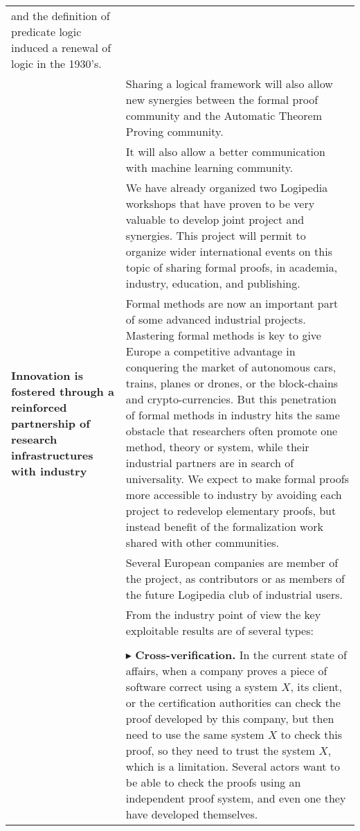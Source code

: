 \begin{longtable}{|p{}|p{}|}
and the definition of predicate logic induced a renewal of logic in
the 1930's.\\
&
\hspace{0.4cm}
Sharing a logical framework will also allow new synergies between 
the formal proof community and the Automatic Theorem Proving community.\\
&
\hspace{0.4cm}
It will also allow a better communication with machine learning community.\\
&
\hspace{0.4cm}
We have already organized two Logipedia workshops that have proven to
be very valuable to develop joint project and synergies.  This project
will permit to organize wider international events on this topic of
sharing formal proofs, in academia, industry, education, and
publishing.\\
\hline
{\bf Innovation is fostered through a reinforced partnership of
research infrastructures with industry}
&
Formal methods are now an important part of some advanced industrial
projects. Mastering formal methods is key to give Europe a competitive
advantage in conquering the market of autonomous cars, trains, planes
or drones, or the block-chains and crypto-currencies. But this
penetration of formal methods in industry hits the same obstacle that
researchers often promote one method, theory or system, while their
industrial partners are in search of universality. We expect to make
formal proofs more accessible to industry by avoiding each project to
redevelop elementary proofs, but instead benefit of the formalization
work shared with other communities.\\
&
\hspace{0.4cm}
Several European companies are member of the project,
as contributors or as members of the future Logipedia
club of industrial users.\\
&
\hspace{0.4cm}
From the industry point of view the key exploitable results are of several
types:\\
&\\
&
$\blacktriangleright$ 
{\bf Cross-verification.}
In the current state of affairs, when a company proves a piece of
software correct using a system $X$, its client, or the certification
authorities can check the proof developed by this company, but then
need to use the same system $X$ to check this proof, so they need to
trust the system $X$, which is a limitation. Several actors want to be
able to check the proofs using an independent proof system, and even
one they have developed themselves.


\end{longtable}
